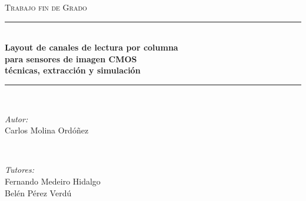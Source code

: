 
\begin{titlepage}

\newcommand{\HRule}{\rule{\linewidth}{0.5mm}} %

\center %


\textsc{\LARGE Trabajo fin de Grado}\\[1.5cm] %






\HRule \\[0.2cm]
{ \large \bfseries Layout de canales de lectura por columna\\[0.1cm]
para sensores de imagen CMOS\\[0.1cm]
técnicas, extracción y simulación}\\[0.2cm]
\HRule \\[1.5cm]


\begin{minipage}{0.4\textwidth}
\begin{flushleft} \large
\emph{Autor:}\\
Carlos Molina Ordóñez
\end{flushleft}
\end{minipage}
~
\begin{minipage}{0.4\textwidth}
\begin{flushright} \large
\vspace{9mm}
\emph{Tutores:} \\
Fernando Medeiro Hidalgo \\
Belén Pérez Verdú
\end{flushright}
\end{minipage}\\[2cm]


\end{titlepage}
